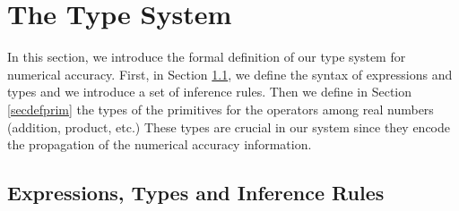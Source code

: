 
\section{The Type System}
\label{infe}

In this section, we introduce the formal definition of our type system for numerical accuracy.
First, in Section \ref{secdeftypes}, we define the syntax of expressions and types and we introduce a set 
of inference rules.
Then we define in Section \ref{secdefprim} the types of the primitives for the operators among real numbers (addition, product, etc.)
These types are crucial in our system since they encode the propagation of the numerical
accuracy information.

\subsection{Expressions, Types and Inference Rules}
\label{secdeftypes}

